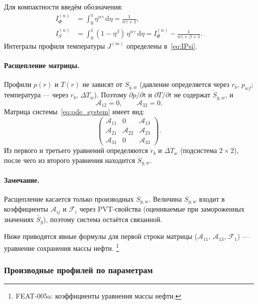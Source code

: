 \documentclass[12pt,a4paper]{article}
\newcommand{\dd}{\mathrm{d}}
\newcommand{\pp}{\partial}
\begin{document}
Для компактности введём обозначения:
\begin{align}
  I_\Phi^{(n)} &= \int_0^1 \eta^{n\gamma}\,\dd\eta
    = \frac{1}{n\gamma + 1}, \label{eq:IPhi} \\
  I_S^{(n)} &= \int_0^1 (1-\eta^\beta)\,\eta^{n\gamma}\,\dd\eta
    = I_\Phi^{(n)} - \frac{1}{n\gamma + \beta + 1}.
    \label{eq:IS}
\end{align}
Интегралы профиля температуры $J^{(m)}$
определены в~\eqref{eq:IPsi}.

\paragraph{Расщепление матрицы.}
Профили $p(r)$ и $T(r)$ не зависят от $S_{g,w}$
(давление определяется через $r_b$, $p_{wf}$;
температура --- через $r_b$, $\Delta T_w$).
Поэтому $\pp p/\pp t$ и $\pp T/\pp t$ не содержат
$\dot{S}_{g,w}$, и
\begin{equation}\label{eq:matrix_structure}
  \mathcal{A}_{12} = 0, \qquad \mathcal{A}_{32} = 0.
\end{equation}
Матрица системы~\eqref{eq:ode_system} имеет вид:
\[
  \begin{pmatrix}
    \mathcal{A}_{11} & 0 & \mathcal{A}_{13} \\
    \mathcal{A}_{21} & \mathcal{A}_{22} & \mathcal{A}_{23} \\
    \mathcal{A}_{31} & 0 & \mathcal{A}_{33}
  \end{pmatrix}.
\]
Из первого и третьего уравнений определяются $\dot{r}_b$
и $\dot{\Delta T}_w$ (подсистема $2\times 2$), после чего
из второго уравнения находится $\dot{S}_{g,w}$.

\paragraph{Замечание.}
Расщепление касается только производных $\dot{S}_{g,w}$.
Величина $S_{g,w}$ входит в коэффициенты $\mathcal{A}_{ij}$
и $\mathcal{F}_i$ через PVT-свойства (оцениваемые
при замороженных значениях $\bar{S}_g$), поэтому
система остаётся связанной.

Ниже приводятся явные формулы для первой строки матрицы
($\mathcal{A}_{11}$, $\mathcal{A}_{13}$, $\mathcal{F}_1$)
--- уравнение сохранения массы нефти.%
\footnote{FEAT-005a: коэффициенты уравнения массы нефти.}

\subsubsection{Производные профилей по параметрам}
\label{sssec:profile_derivatives}
\end{document}
